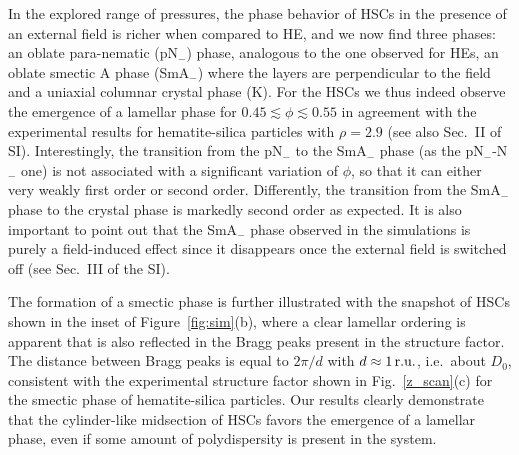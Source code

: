 \documentclass[aps,prl,preprint,superscriptaddress,showkeys]{revtex4-2} %
\begin{document}
In the explored range of pressures, the phase behavior of HSCs in the presence of an external field is richer when compared to HE, and we now find three phases: an oblate para-nematic (pN$_-$) phase, analogous to the one observed for HEs, an oblate smectic A phase (SmA$_-$) where the layers are perpendicular to the field and a uniaxial columnar crystal phase (K). For the HSCs we thus indeed observe the emergence of a lamellar phase for $0.45\lesssim\phi\lesssim 0.55$ in agreement with the experimental results for hematite-silica particles with $\rho=2.9$ (see also Sec.~II of SI). Interestingly, the transition from the pN$_-$ to the SmA$_-$ phase (as the pN$_-$-N$_-$ one) is not associated with a significant variation of $\phi$, so that it can either very weakly first order or second order. Differently, the transition from the SmA$_-$ phase to the crystal phase is markedly second order as expected. It is also important to point out that the SmA$_-$ phase observed in the simulations is purely a field-induced effect since it disappears once the external field is switched off (see Sec.~III of the SI).\par
The formation of a smectic phase is further illustrated with the snapshot of HSCs shown in the inset of Figure~\ref{fig:sim}(b), where a clear lamellar ordering is apparent that is also reflected in the Bragg peaks present in the structure factor. The distance between Bragg peaks is equal to $2\pi/d$ with $d\approx 1\,\hbox{r.u.}$, i.e.~about $D_0$, consistent with the experimental structure factor shown in Fig.~\ref{z_scan}(c) for the smectic phase of hematite-silica particles. Our results clearly demonstrate that the cylinder-like midsection of HSCs favors the emergence of a lamellar phase, even if some amount of polydispersity is present in the system.\par
\end{document}
